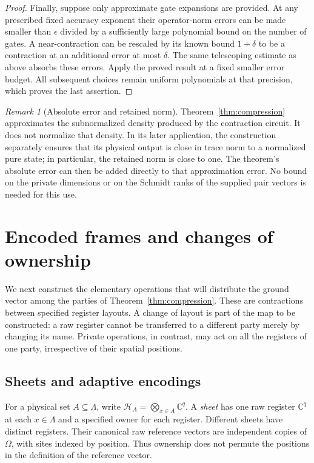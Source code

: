 \documentclass[11pt]{article}
\numberwithin{equation}{section}
\theoremstyle{definition}
\theoremstyle{remark}
\newtheorem{remark}[theorem]{Remark}
\begin{document}
\begin{proof}
Finally, suppose only approximate gate expansions are provided.  At
any prescribed fixed accuracy exponent their operator-norm errors can
be made smaller than $\epsilon$ divided by a sufficiently large
polynomial bound on the number of gates.  A near-contraction can be
rescaled by its known bound $1+\delta$ to be a contraction at an
additional error at most $\delta$.  The same telescoping estimate as
above absorbs these errors.  Apply the proved result at a fixed
smaller error budget.  All subsequent choices remain uniform
polynomials at that precision, which proves the last assertion.
\end{proof}

\begin{remark}[Absolute error and retained norm]
\label{rem:compression-retained-norm}
Theorem~\ref{thm:compression} approximates the subnormalized density
produced by the contraction circuit.  It does not normalize that
density.  In its later application, the construction separately ensures
that its physical output is close in trace norm to a normalized pure
state; in particular, the retained norm is close to one.  The theorem's
absolute error can then be added directly to that approximation error.
No bound on the private dimensions or on the Schmidt ranks of the
supplied pair vectors is needed for this use.
\end{remark}

\section{Encoded frames and changes of ownership}\label{sec:frames}

We next construct the elementary operations that will distribute the ground
vector among the parties of Theorem~\ref{thm:compression}.  These are
contractions between specified register layouts.  A change of layout is part
of the map to be constructed: a raw register cannot be transferred to a
different party merely by changing its name.  Private operations, in contrast,
may act on all the registers of one party, irrespective of their spatial
positions.

\subsection{Sheets and adaptive encodings}

For a physical set $A\subseteq\Lambda$, write
$\mathcal H_A=\bigotimes_{x\in A}\mathbb C^q$.  A \emph{sheet} has one raw
register $\mathbb C^q$ at each $x\in\Lambda$ and a specified owner for each
register.  Different sheets have distinct registers.  Their canonical raw
reference vectors are independent copies of $\Omega$, with sites indexed by
position.  Thus ownership does not permute the positions in the definition
of the reference vector.
\end{document}

